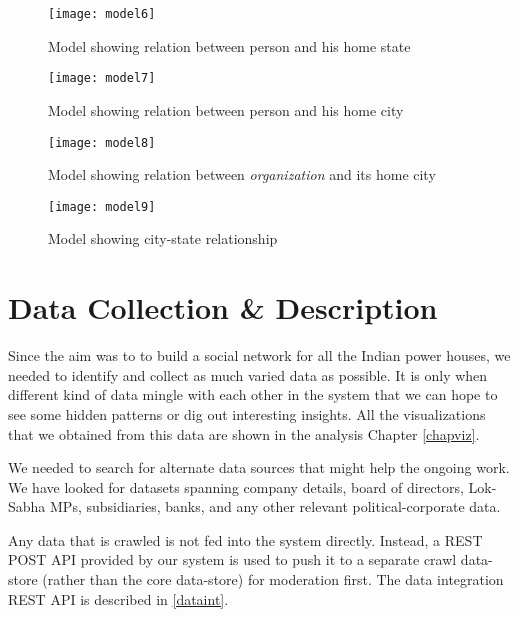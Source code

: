 \begin{figure}[H]
\begin{center}	
\texttt{[image: model6]} 
\caption{Model showing relation between person and his home state}
\label{fig:model6}
\end{center}
\end{figure}

\begin{figure}[H]
\begin{center}	
\texttt{[image: model7]} 
\caption{Model showing relation between person and his home city}
\label{fig:model7}
\end{center}
\end{figure}

\begin{figure}[H]
\begin{center}	
\texttt{[image: model8]} 
\caption{Model showing relation between \emph{organization} and its home city}
\label{fig:model8}
\end{center}
\end{figure}

\begin{figure}[H]
\begin{center}	
\texttt{[image: model9]} 
\caption{Model showing city-state relationship}
\label{fig:model9}
\end{center}
\end{figure}

\section{Data Collection \& Description}
\label{datacollect}

Since the aim was to to build a social network for all the Indian power houses, we needed to identify and collect as much varied data as possible. It is only when different kind of data mingle with each other in the system that we can hope to see some hidden patterns or dig out interesting insights. All the visualizations that we obtained from this data are shown in the analysis Chapter \ref{chapviz}.

We needed to search for alternate data sources that might help the ongoing work. We have looked for datasets spanning company details, board of directors, Lok-Sabha MPs, subsidiaries, banks, and any other relevant political-corporate data. 

Any data that is crawled is not fed into the system directly. Instead, a REST POST API provided by our system is used to push it to a separate crawl data-store (rather than the core data-store) for moderation first. The  data integration REST API is described in \ref{dataint}. 

